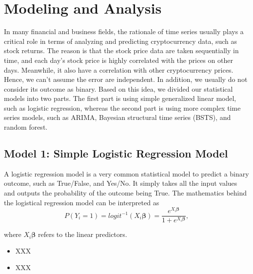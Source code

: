 \documentclass{article}
\begin{document}
\section{Modeling and Analysis}
In many financial and business fields, the rationale of time series usually plays a critical role in terms of analyzing and predicting cryptocurrency data, such as stock returns. The reason is that the stock price data are taken sequentially in time, and each day’s stock price is highly correlated with the prices on other days. Meanwhile, it also have a correlation with other cryptocurrency prices. Hence, we can’t assume the error are independent. In addition, we usually do not consider its outcome as binary. Based on this idea, we divided our statistical models into two parts. The first part is using simple generalized linear model, such as logistic regression, whereas the second part is using more complex time series models, such as ARIMA, Bayesian structural time series (BSTS), and random forest.\\

\subsection{Model 1: Simple Logistic Regression Model}
A logistic regression model is a very common statistical model to predict a binary outcome, such as True/False, and Yes/No. It simply takes all the input values and outputs the probability of the outcome being True. The mathematics behind the logistical regression model can be interpreted as
$$P(Y_i=1)=logit^{-1}(X_i\bm{\beta})=\frac{e^{X_i\bm{\beta}}}{1+e^{X_i\bm{\beta}}},$$

\noindent where $X_i\bm{\beta}$ refers to the linear predictors.



\begin{itemize}
  	\item XXX
	\item XXX
\end{itemize}


\end{document}
